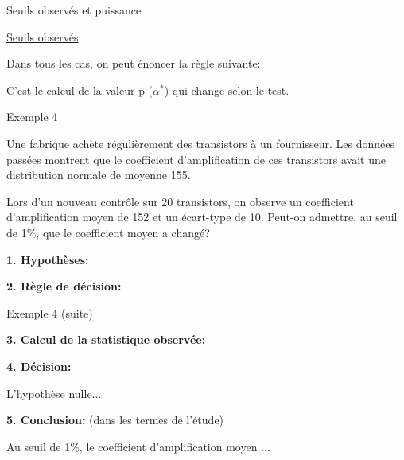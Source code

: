 \documentclass{BeamerTemplate}
\begin{document}

\begin{frame}[t]{Seuils observés et puissance}

\underline{Seuils observés}:

Dans tous les cas, on peut énoncer la règle suivante:

\centerline{}

C'est le calcul de la valeur-p ($\alpha^*$) qui change selon le test.

\bigskip
{}
\end{frame}

\begin{frame}[t]{Exemple 4}

Une fabrique achète régulièrement des transistors à un fournisseur. Les données passées montrent que le coefficient d'amplification de ces transistors avait une distribution normale de moyenne 155.

\medskip

Lors d'un nouveau contrôle sur 20 transistors, on observe un coefficient d'amplification moyen de 152 et un écart-type de 10. Peut-on admettre, au seuil de 1\%, que le coefficient  moyen a changé?


\bigskip

{\bf 1. Hypothèses:}
\bigskip

{\bf 2. Règle de décision:}

\end{frame}

\begin{frame}[t]{Exemple 4 (suite)}

{\bf 3. Calcul de la statistique observée:}

\vfill
{\bf 4. Décision:}

L'hypothèse nulle...

\bigskip
{\bf 5. Conclusion:} (dans les termes de l'étude)

Au seuil de 1\%, le coefficient d'amplification moyen ...
\bigskip

\end{frame}
\end{document}
